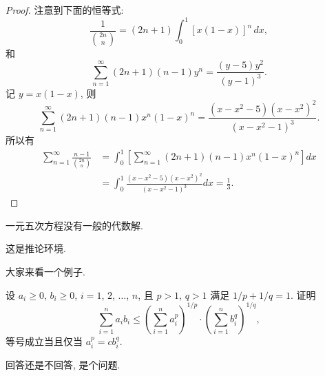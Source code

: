 \begin{proof}
注意到下面的恒等式:
\[
\frac{1}{\binom{2n}{n}}=(2n+1)\int_0^1[x(1-x)]^n\,dx,
\]
和
\[
\sum_{n=1}^{\infty}(2n+1)(n-1)y^n=\frac{(y-5)y^2}{(y-1)^3}.
\]
记 $y=x(1-x)$, 则
\[
\sum_{n=1}^{\infty}(2n+1)(n-1)x^n(1-x)^n=\frac{(x-x^2-5)(x-x^2)^2}{(x-x^2-1)^3}.
\]
所以有
\begin{align*}
\sum_{n=1}^{\infty}\frac{n-1}{\binom{2n}{n}} & =
\int_0^1\left[\sum_{n=1}^{\infty}(2n+1)(n-1)x^n(1-x)^n\right]dx\\
& =\int_0^1\frac{(x-x^2-5)(x-x^2)^2}{(x-x^2-1)^3}dx=\frac13.
\end{align*}
\end{proof}

\begin{theorem}\label{the:theorem1}
一元五次方程没有一般的代数解.
\end{theorem}

\begin{corollary}
这是推论环境.
\end{corollary}

\begin{example}
大家来看一个例子.
\end{example}

\begin{exercise}
设 $a_i\geq0$, $b_i\geq0$, $i=1$, $2$, $\ldots$, $n$, 
且 $p>1$, $q>1$ 满足 $1/p+1/q=1$. 证明
\[
\sum_{i=1}^{n}a_ib_i\leq\left(\sum_{i=1}^{n}a_i^p\right)^{1/p}
\cdot\left(\sum_{i=1}^{n}b_i^q\right)^{1/q},
\]
等号成立当且仅当 $a_i^p=cb_i^q$.
\end{exercise}

\begin{problem}
回答还是不回答, 是个问题. 
\end{problem}
